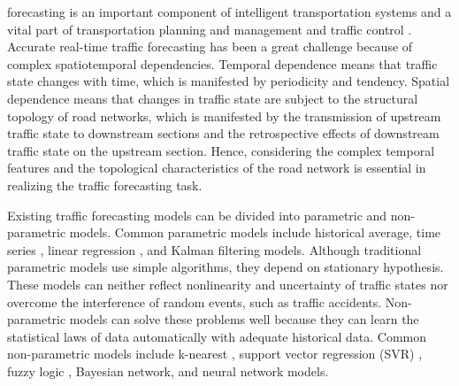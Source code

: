 \documentclass[10pt,journal,compsoc]{IEEEtran}
\begin{document}
% 
% 
% 
% 
 forecasting is an important component of intelligent transportation systems and a vital part of transportation planning and management and traffic control \cite {Huang2005Dynamic,Jian2012Synthesis,Jing2004A,Gaoa2018Measuring}. Accurate real-time traffic forecasting has been a great challenge because of complex spatiotemporal dependencies. Temporal dependence means that traffic state changes with time, which is manifested by periodicity and tendency. Spatial dependence means that changes in traffic state are subject to the structural topology of road networks, which is manifested by the transmission of upstream traffic state to downstream sections and the retrospective effects of downstream traffic state on the upstream section\cite{Dong2012Spatial}. Hence, considering the complex temporal features and the topological characteristics of 
the road network is essential in realizing the traffic forecasting task.
\par Existing traffic forecasting models can be divided into parametric and non-parametric models. Common parametric models include historical average, time series \cite{Ahmed1979ANALYSIS,Hodge2014Short}, linear regression \cite{Sun2004Interval}, and Kalman filtering models\cite{Okutani1984Dynamic}. Although traditional parametric models use simple algorithms, they depend on stationary hypothesis. These models can neither reflect nonlinearity and uncertainty of traffic states nor overcome the interference of random events, such as traffic accidents. Non-parametric models can solve these problems well because they can learn the statistical laws of data automatically with adequate historical data. Common non-parametric models include k-nearest \cite{Altman1992An}, support vector regression (SVR) \cite{article,Fu2013Short}, fuzzy logic \cite{Yin2002Urban}, Bayesian network\cite{Sun2006A}, and neural network models.
\end{document}

